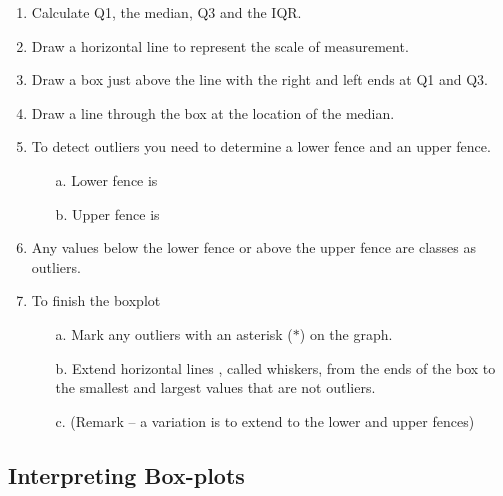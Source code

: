 \documentclass[12pt]{article}
\begin{document}
\begin{enumerate}
\item	Calculate Q1, the median, Q3 and the IQR.

\item	Draw a horizontal line to represent the scale of measurement.

\item	Draw a box just above  the line with the right and left ends at Q1 and Q3.

\item	Draw a line through the box at the location of the median.

\item	To detect outliers you need to determine a lower fence and an upper fence.	
\begin{itemize}
\item[a.]	Lower fence is  
\item[b.]	Upper fence is  
\end{itemize}

\item	Any values below the lower fence or above the upper fence are classes as outliers.

\item	To finish the boxplot
\begin{itemize}
\item[a.]	Mark any outliers with an asterisk ($\ast$) on the graph.
\item[b.]	Extend horizontal lines , called whiskers, from the ends of the box to the smallest and largest values that are not outliers.
\item[c.]	(Remark – a variation is to extend to the lower and upper fences)
\end{itemize}
\end{enumerate}

\subsection{Interpreting Box-plots}
\end{document}
